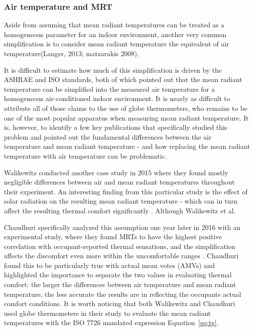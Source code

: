 \subsubsection{Air temperature and MRT}
        Aside from assuming that mean radiant temperatures can be treated as a homogeneous parameter for an indoor environment, another very common simplification is to consider mean radiant temperature the equivalent of air temperature\cite{kantor_most_2011}(Langer, 2013; matzarakis 2008). 
        
        It is difficult to estimate how much of this simplification is driven by the ASHRAE and ISO standards, both of which pointed out that the mean radiant temperature can be simplified into the measured air temperature for a homogeneous air-conditioned indoor environment. It is nearly as difficult to attribute all of those claims to the use of globe thermometers, who remains to be one of the most popular apparatus when measuring mean radiant temperature\cite{kantor_most_2011}. It is, however, to identify a few key publications that specifically studied this problem and pointed out the fundamental differences between the air temperature and mean radiant temperature - and how replacing the mean radiant temperature with air temperature can be problematic. 

        Walikewitz conducted another case study in 2015 where they found mostly negligible differences between air and mean radiant temperatures throughout their experiment. An interesting finding from this particular study is the effect of solar radiation on the resulting mean radiant temperature - which can in turn affect the resulting thermal comfort significantly \cite{walikewitz_difference_2015}. Although Walikewitz et al. 

        Chaudhuri specifically analyzed this assumption one year later in 2016 with an experimental study, where they found MRTs to have the highest positive correlation with occupant-reported thermal sensations, and the simplification affects the discomfort even more within the uncomfortable ranges \cite{chaudhuri_assuming_2016}. Chaudhuri found this to be particularly true with actual mean votes (AMVs) and highlighted the importance to separate the two values in evaluating thermal comfort: the larger the differences between air temperature and mean radiant temperature, the less accurate the results are in reflecting the occupants actual comfort conditions. It is worth noticing that both Walikewitz and Chaudhuri used globe thermometers in their study to evaluate the mean radiant temperatures with the ISO 7726 \cite{standardization_iso7726_2001} mandated expression Equation~\ref{eq:tg}. 

